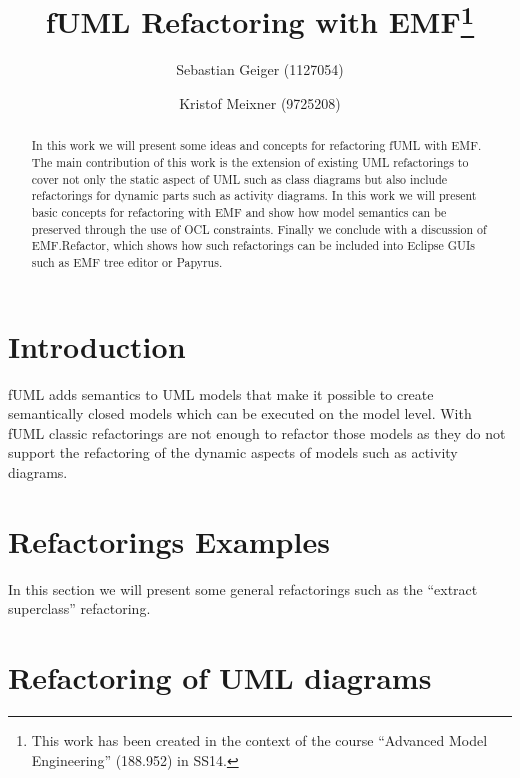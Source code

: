 \documentclass{llncs}
\begin{document}
\pagestyle{plain}

\title{fUML Refactoring with EMF\footnote{This work has been created in the context of the course ``Advanced Model Engineering'' (188.952) in SS14.}}

\author{Sebastian Geiger (1127054) \and Kristof Meixner (9725208)}

\maketitle

\begin{abstract}
In this work we will present some ideas and concepts for refactoring fUML with EMF. The main contribution of this work is the extension of
existing UML refactorings to cover not only the static aspect of UML such as class diagrams but also include refactorings for dynamic
parts such as activity diagrams. In this work we will present basic concepts for refactoring with EMF and show how model semantics can be
preserved through the use of OCL constraints. Finally we conclude with a discussion of EMF.Refactor, which shows how such refactorings
can be included into Eclipse GUIs such as EMF tree editor or Papyrus.
\end{abstract}

\tableofcontents
\newpage


\section{Introduction}
fUML adds semantics to UML models that make it possible to create semantically closed models which can be executed on the model level. With
fUML classic refactorings are not enough to refactor those models as they do not support the refactoring of the dynamic aspects of models
such as activity diagrams.

\section{Refactorings Examples}
In this section we will present some general refactorings such as the ``extract superclass'' refactoring.

\section{Refactoring of UML diagrams}
\end{document}
